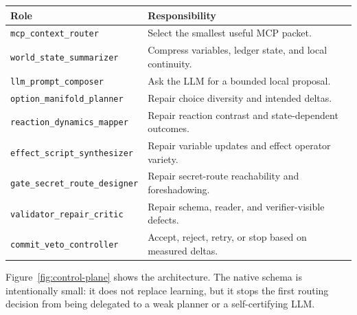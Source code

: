 \documentclass[11pt]{article}
\begin{document}
\begin{center}
\begin{tabular}{ll}
\toprule
Role & Responsibility \\
\midrule
\texttt{mcp\_context\_router} & Select the smallest useful MCP packet. \\
\texttt{world\_state\_summarizer} & Compress variables, ledger state, and local continuity. \\
\texttt{llm\_prompt\_composer} & Ask the LLM for a bounded local proposal. \\
\texttt{option\_manifold\_planner} & Repair choice diversity and intended deltas. \\
\texttt{reaction\_dynamics\_mapper} & Repair reaction contrast and state-dependent outcomes. \\
\texttt{effect\_script\_synthesizer} & Repair variable updates and effect operator variety. \\
\texttt{gate\_secret\_route\_designer} & Repair secret-route reachability and foreshadowing. \\
\texttt{validator\_repair\_critic} & Repair schema, reader, and verifier-visible defects. \\
\texttt{commit\_veto\_controller} & Accept, reject, retry, or stop based on measured deltas. \\
\bottomrule
\end{tabular}
\end{center}

Figure~\ref{fig:control-plane} shows the architecture. The native schema is intentionally small: it does not replace learning, but it stops the first routing decision from being delegated to a weak planner or a self-certifying LLM.
\end{document}
